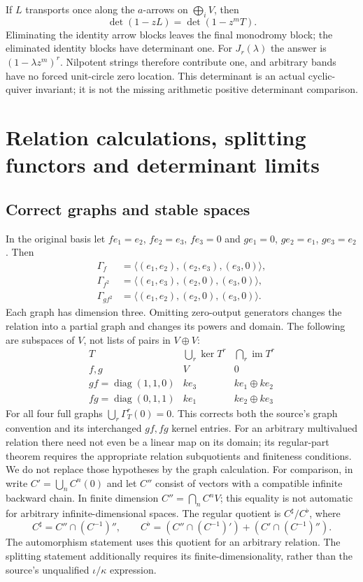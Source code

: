 \documentclass[11pt,oneside,openany]{book}
\theoremstyle{definition}\newtheorem{definition}[theorem]{Definition}
\theoremstyle{remark}\newtheorem{remark}[theorem]{Remark}
\begin{document}
If $L$ transports once along the $a$-arrows on $\bigoplus_iV$, then
\begin{equation}\label{rel:det}
 \det(1-zL)=\det(1-z^mT).
\end{equation}
Eliminating the identity arrow blocks leaves the final monodromy block;
the eliminated identity blocks have determinant one. For $J_r(\lambda)$
the answer is $(1-\lambda z^m)^r$. Nilpotent strings therefore contribute
one, and arbitrary bands have no forced unit-circle zero location. This
determinant is an actual cyclic-quiver invariant; it is not the missing
arithmetic positive determinant comparison.

\section{Relation calculations, splitting functors and determinant limits}
\label{rel:details}
\subsection{Correct graphs and stable spaces}
In the original basis let $f e_1=e_2$, $f e_2=e_3$, $f e_3=0$ and
$g e_1=0$, $g e_2=e_1$, $g e_3=e_2$. Then
\[
\begin{split}
 \Gamma_f&=\langle(e_1,e_2),(e_2,e_3),(e_3,0)\rangle,\\
 \Gamma_{f^2}&=\langle(e_1,e_3),(e_2,0),(e_3,0)\rangle,\\
 \Gamma_{gf^2}&=\langle(e_1,e_2),(e_2,0),(e_3,0)\rangle.
\end{split}
\]
Each graph has dimension three. Omitting zero-output generators changes
the relation into a partial graph and changes its powers and domain.
The following are subspaces of $V$, not lists of pairs in $V\oplus V$:
\[
\begin{array}{c|cc}
T&\bigcup_r\ker T^r&\bigcap_r\operatorname{im}T^r\\\hline
f,g&V&0\\
gf=\operatorname{diag}(1,1,0)&ke_3&ke_1\oplus ke_2\\
fg=\operatorname{diag}(0,1,1)&ke_1&ke_2\oplus ke_3
\end{array}
\]
For all four full graphs $\bigcup_r\Gamma_T^r(0)=0$. This corrects both
the source's graph convention and its interchanged $gf,fg$ kernel entries.
For an arbitrary multivalued relation there need not even be a linear map
on its domain; its regular-part theorem requires the appropriate relation
subquotients and finiteness conditions. We do not replace those hypotheses
by the graph calculation.
For comparison, in \cite[Section 4, Lemmas 4.2,4.5--4.6]{CrawleyBoeveyStrings}
write $C'=\bigcup_n C^n(0)$ and let $C''$ consist of vectors with a
compatible infinite backward chain. In finite dimension $C''=\bigcap_n C^nV$;
this equality is not automatic for arbitrary infinite-dimensional spaces.
The regular quotient is $C^\sharp/C^\flat$, where
\[
 C^\sharp=C''\cap(C^{-1})'',\qquad
 C^\flat=(C''\cap(C^{-1})')+(C'\cap(C^{-1})'').
\]
The automorphism statement uses this quotient for an arbitrary relation.
The splitting statement additionally requires its finite-dimensionality,
rather than the source's unqualified $\iota/\kappa$ expression.
\end{document}
